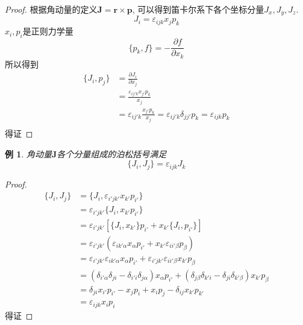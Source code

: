 \documentclass[a4paper,11pt]{article}
\newtheorem{proof}{证明}[section]
\newtheorem{example}{例}[section]
\begin{document}
\begin{proof}
  根据角动量的定义$\mathbf{J}=\mathbf{r}\times\mathbf{p}$, 可以得到笛卡尔系下各个坐标分量$J_x,J_y,J_z$.
\begin{equation*}
  J_i=\varepsilon_{ijk}x_jp_k
\end{equation*}
$x_i,p_i$是正则力学量
\begin{equation*}
  \{p_k,f\}=-\frac{\partial f}{\partial{x_k}}
\end{equation*}
所以得到
\begin{equation*}
  \begin{split}
     \{J_i,p_j\}&=\frac{\partial J_i}{\partial{x_j}} \\
       &=\frac{\varepsilon_{ij'k}x_{j'}p_k}{x_j} \\
       &=\varepsilon_{ij'k}\frac{x_{j'}p_k}{x_j}=\varepsilon_{ij'k}\delta_{jj'}p_k=\varepsilon_{ijk}p_k \\
  \end{split}
\end{equation*}
得证
\end{proof}
\begin{example}
  角动量$\mathbf{J}$各个分量组成的泊松括号满足
\begin{equation*}
  \{J_i,J_j\}=\varepsilon_{ijk}J_k
\end{equation*}
\end{example}
\begin{proof}
\begin{equation*}
  \begin{split}
     \{J_i,J_j\}&=\{J_i,\varepsilon_{i'jk'}x_{k'}p_{i'}\} \\
       &=\varepsilon_{i'jk'}\{J_i,x_{k'}p_{i'}\} \\
       &=\varepsilon_{i'jk'}\left[\{J_{i},x_{k'}\}p_{i'}+x_{k'}\{J_i,p_{i'}\}\right] \\
       &=\varepsilon_{i'jk'}\left(\varepsilon_{ik'\alpha}x_\alpha p_{i'}+x_{k'}\varepsilon_{ii'\beta}p_\beta\right) \\
       &=\varepsilon_{i'jk'}\varepsilon_{ik'\alpha}x_\alpha p_{i'}+\varepsilon_{i'jk'}\varepsilon_{ii'\beta}x_{k'}p_\beta \\
       &=\left(\delta_{i'\alpha}\delta_{ji}-\delta_{i'i}\delta_{j\alpha}\right)x_\alpha p_{i'}+\left(\delta_{j\beta}\delta_{k'i}-\delta_{ji}\delta_{k'\beta}\right)x_{k'}p_\beta \\
       &=\delta_{ji}x_{i'}p_{i'}-x_jp_i+x_ip_j-\delta_{ij}x_{k'}p_{k'} \\
       &=\varepsilon_{ijk}x_ip_i
  \end{split}
\end{equation*}
得证
\end{proof}
\end{document}
